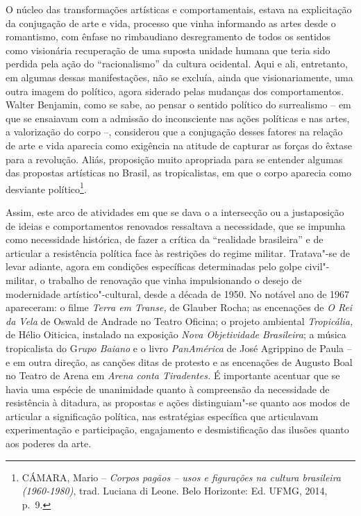 O núcleo das transformações artísticas e comportamentais, estava na
explicitação da conjugação de arte e vida, processo que vinha informando
as artes desde o romantismo, com ênfase no rimbaudiano desregramento de
todos os sentidos como visionária recuperação de uma suposta unidade
humana que teria sido perdida pela ação do ``racionalismo'' da cultura
ocidental. Aqui e ali, entretanto, em algumas dessas manifestações, não
se excluía, ainda que visionariamente, uma outra imagem do político,
agora siderado pelas mudanças dos comportamentos. Walter Benjamin, como
se sabe, ao pensar o sentido político do surrealismo -- em que se
ensaiavam com a admissão do inconsciente nas ações políticas e nas
artes, a valorização do corpo --, considerou que a conjugação desses
fatores na relação de arte e vida aparecia como exigência na atitude de
capturar as forças do êxtase para a revolução. Aliás, proposição muito
apropriada para se entender algumas das propostas artísticas no Brasil,
as tropicalistas, em que o corpo aparecia como desviante
político\footnote{\textsc{CÁMARA}, Mario -- \emph{Corpos pagãos -- usos e figurações
  na cultura brasileira (1960-1980)}, trad. Luciana di Leone. Belo
  Horizonte: Ed. \textsc{UFMG}, 2014, p.~9.}.

Assim, este arco de atividades em que se dava o a intersecção ou a
justaposição de ideias e comportamentos renovados ressaltava a
necessidade, que se impunha como necessidade histórica, de fazer a
crítica da ``realidade brasileira'' e de articular a resistência
política face às restrições do regime militar. Tratava"-se de levar
adiante, agora em condições específicas determinadas pelo golpe
civil"-militar, o trabalho de renovação que vinha impulsionando o desejo
de modernidade artístico"-cultural, desde a década de 1950. No notável
ano de 1967 apareceram: o filme \emph{Terra em Transe,} de Glauber
Rocha; as encenações de \emph{O Rei da Vela} de Oswald de Andrade no
Teatro Oficina; o projeto ambiental \emph{Tropicália,} de Hélio
Oiticica, instalado na exposição \emph{Nova Objetividade Brasileira}; a
música tropicalista do G\emph{rupo Baiano} e o livro \emph{PanAmérica}
de José Agrippino de Paula -- e em outra direção, as canções ditas de
protesto e as encenações de Augusto Boal no Teatro de Arena em
\emph{Arena conta Tiradentes.} É importante acentuar que se havia uma
espécie de unanimidade quanto à compreensão da necessidade de
resistência à ditadura, as propostas e ações distinguiam"-se quanto aos
modos de articular a significação política, nas estratégias específica
que articulavam experimentação e participação, engajamento e
desmistificação das ilusões quanto aos poderes da arte.

